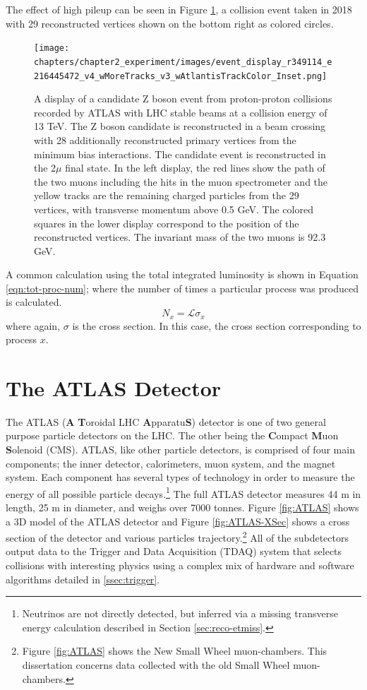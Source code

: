 		The effect of high pileup can be seen in Figure \ref{fig:high-pileup-event-display}, a collision event taken in 2018 with 29 reconstructed vertices shown on the bottom right as colored circles.
		\begin{figure}[!ht]
		\centering
		\texttt{[image: chapters/chapter2\_experiment/images/event\_display\_r349114\_e216445472\_v4\_wMoreTracks\_v3\_wAtlantisTrackColor\_Inset.png]}
		\caption{ A display of a candidate Z boson event from proton-proton collisions recorded by ATLAS with LHC stable beams at a collision energy of 13 TeV. The Z boson candidate is reconstructed in a beam crossing with 28 additionally reconstructed primary vertices from the minimum bias interactions. The candidate event is reconstructed in the 2$\mu$ final state. In the left display, the red lines show the path of the two muons including the hits in the muon spectrometer and the yellow tracks are the remaining charged particles from the 29 vertices, with transverse momentum above 0.5 GeV. The colored squares in the lower display correspond to the position of the reconstructed vertices. The invariant mass of the two muons is 92.3 GeV. }
		\label{fig:high-pileup-event-display}
		\end{figure}


		A common calculation using the total integrated luminosity is shown in Equation \ref{eqn:tot-proc-num}; where the number of times a particular process was produced is calculated.
		\begin{equation}\label{eqn:tot-proc-num}
		N_{x} = \mathcal{L} \sigma_{x}
		\end{equation}
		where again, $\sigma$ is the cross section. In this case, the cross section corresponding to process $x$.


\section{The ATLAS Detector}\label{sec:ATLAS}
	The ATLAS (\textbf{A} \textbf{T}oroidal LHC \textbf{A}pparatu\textbf{S}) detector is one of two general purpose particle detectors on the LHC. The other being the \textbf{C}ompact \textbf{M}uon \textbf{S}olenoid (CMS). ATLAS, like other particle detectors, is comprised of four main components; the inner detector, calorimeters, muon system, and the magnet system. Each component has several types of technology in order to measure the energy of all possible particle decays.\footnote{Neutrinos are not directly detected, but inferred via a missing transverse energy calculation described in Section \ref{sec:reco-etmiss}.} The full ATLAS detector measures 44 m in length, 25 m in diameter, and weighs over 7000 tonnes. Figure \ref{fig:ATLAS} shows a 3D model of the ATLAS detector and Figure \ref{fig:ATLAS-XSec} shows a cross section of the detector and various particles trajectory.\footnote{Figure \ref{fig:ATLAS} shows the New Small Wheel muon-chambers. This dissertation concerns data collected with the old Small Wheel muon-chambers.} All of the subdetectors output data to the Trigger and Data Acquisition (TDAQ) system that selects collisions with interesting physics using a complex mix of hardware and software algorithms detailed in \ref{ssec:trigger}. 

